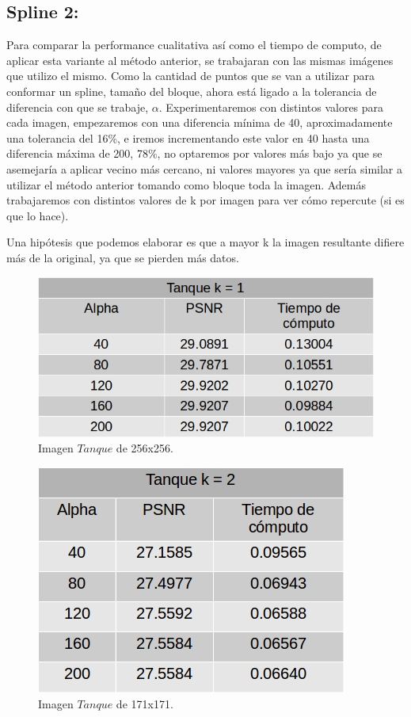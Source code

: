 \documentclass[a4paper]{article}
\begin{document}
\subsection{Spline 2:}

Para comparar la performance cualitativa así como el tiempo de computo, de aplicar esta variante al método anterior, se trabajaran con las mismas imágenes que utilizo el mismo. Como la cantidad de puntos que se van a utilizar para conformar un spline, tamaño del bloque, ahora está ligado a la tolerancia de diferencia con que se trabaje, $\alpha$. Experimentaremos con distintos valores para cada imagen, empezaremos con una diferencia mínima de 40, aproximadamente una tolerancia del 16\%, e iremos incrementando este valor en 40 hasta una diferencia máxima de 200, 78\%, no optaremos por valores más bajo ya que se asemejaría a aplicar vecino más cercano, ni valores mayores ya que sería similar a utilizar el método anterior tomando como bloque toda la imagen. Además trabajaremos con distintos valores de k por imagen para ver cómo repercute (si es que lo hace).   

Una hipótesis que podemos elaborar es que a mayor k la imagen resultante difiere más de la original, ya que se pierden más datos.    



\begin{figure}[H]
    \centering
    \includegraphics[scale=0.4]{imagenes/tanque1.jpg}
    \caption{Imagen $Tanque$ de 256x256.}
	\label{tanquee}
    \end{figure}
	
\begin{figure}[H]
    \centering
    \includegraphics[scale=0.4]{imagenes/tanque2.jpg}
    \caption{Imagen $Tanque$ de 171x171.}
	\label{tanquee}
    \end{figure}
    
\end{document}
